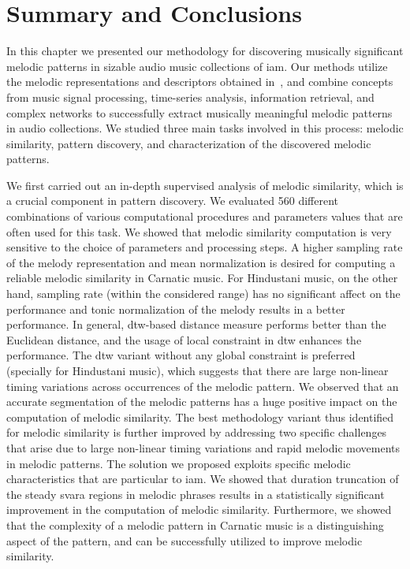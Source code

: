 {\section{Summary and Conclusions}
\label{sec:conclusions_patterns}

In this chapter we presented our methodology for discovering musically significant melodic patterns in sizable audio music collections of \gls{iam}. Our methods utilize the melodic representations and descriptors obtained in~, and combine concepts from music signal processing, time-series analysis, information retrieval, and complex networks to successfully extract musically meaningful melodic patterns in audio collections. We studied three main tasks involved in this process: melodic similarity, pattern discovery, and characterization of the discovered melodic patterns. 

We first carried out an in-depth supervised analysis of melodic similarity, which is a crucial component in pattern discovery. We evaluated 560 different combinations of various computational procedures and parameters values that are often used for this task. We showed that melodic similarity computation is very sensitive to the choice of parameters and processing steps. A higher sampling rate of the melody representation and mean normalization is desired for computing a reliable melodic similarity in Carnatic music. For Hindustani music, on the other hand, sampling rate (within the considered range) has no significant affect on the performance and tonic normalization of the melody results in a better performance. In general, \gls{dtw}-based distance measure performs better than the Euclidean distance, and the usage of local constraint in \gls{dtw} enhances the performance. The \gls{dtw} variant without any global constraint is preferred (specially for Hindustani music), which suggests that there are large non-linear timing variations across occurrences of the melodic pattern. We observed that an accurate segmentation of the melodic patterns has a huge positive impact on the computation of melodic similarity. The best methodology variant thus identified for melodic similarity is further improved by addressing two specific challenges that arise due to large non-linear timing variations and rapid melodic movements in melodic patterns. The solution we proposed exploits specific melodic characteristics that are particular to \gls{iam}. We showed that duration truncation of the steady \gls{svara} regions in melodic phrases results in a statistically significant improvement in the computation of melodic similarity. Furthermore, we showed that the complexity of a melodic pattern in Carnatic music is a distinguishing aspect of the pattern, and can be successfully utilized to improve melodic similarity.

}
